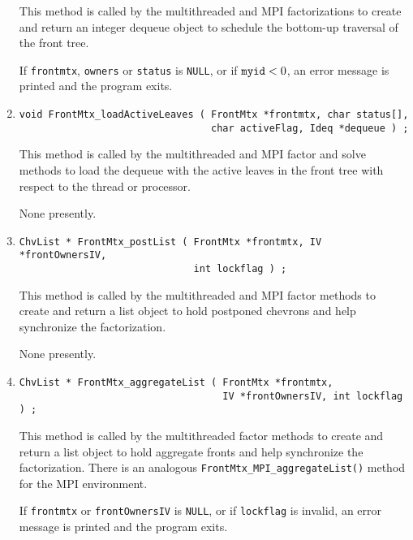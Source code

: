 \begin{enumerate}
This method is called by the multithreaded and MPI factorizations
to create and return an integer dequeue object to schedule the bottom-up
traversal of the front tree.
\par {}
If {\tt frontmtx}, {\tt owners} or {\tt status} is {\tt NULL},
or if ${\tt myid} < 0$,
an error message is printed and the program exits.
\item
\begin{verbatim}
void FrontMtx_loadActiveLeaves ( FrontMtx *frontmtx, char status[],
                                 char activeFlag, Ideq *dequeue ) ;
\end{verbatim}
This method is called by the multithreaded and MPI factor and solve
methods to load the dequeue with the active leaves in the front
tree with respect to the thread or processor.
\par {}
None presently.
\item
\begin{verbatim}
ChvList * FrontMtx_postList ( FrontMtx *frontmtx, IV *frontOwnersIV,
                              int lockflag ) ;
\end{verbatim}
This method is called by the multithreaded and MPI factor 
methods to create and return a list object to hold postponed
chevrons and help synchronize the factorization.
\par {}
None presently.
\item
\begin{verbatim}
ChvList * FrontMtx_aggregateList ( FrontMtx *frontmtx,
                                   IV *frontOwnersIV, int lockflag ) ;
\end{verbatim}
This method is called by the multithreaded factor 
methods to create and return a list object to hold aggregate
fronts and help synchronize the factorization.
There is an analogous {\tt FrontMtx\_MPI\_aggregateList()} method
for the MPI environment.
\par {}
If {\tt frontmtx} or {\tt frontOwnersIV} is {\tt NULL},
or if {\tt lockflag} is invalid,
an error message is printed and the program exits.

\end{enumerate}
